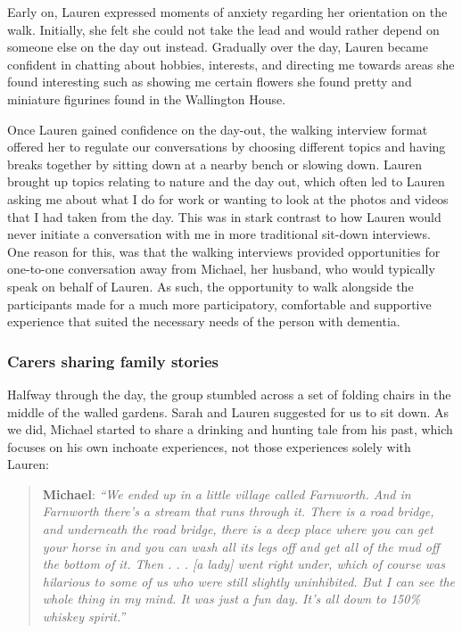 Early on, Lauren expressed moments of anxiety regarding her orientation on the walk. Initially, she felt she could not take the lead and would rather depend on someone else on the day out instead. Gradually over the day, Lauren became confident in chatting about hobbies, interests, and directing me towards areas she found interesting such as showing me certain flowers she found pretty and miniature figurines found in the Wallington House.

Once Lauren gained confidence on the day-out, the walking interview format offered her to regulate our conversations by choosing different topics and having breaks together by sitting down at a nearby bench or slowing down. Lauren brought up topics relating to nature and the day out, which often led to Lauren asking me about what I do for work or wanting to look at the photos and videos that I had taken from the day. This was in stark contrast to how Lauren would never initiate a conversation with me in more traditional sit-down interviews. One reason for this, was that the walking interviews provided opportunities for one-to-one conversation away from Michael, her husband, who would typically speak on behalf of Lauren. As such, the opportunity to walk alongside the participants made for a much more participatory, comfortable and supportive experience that suited the necessary needs of the person with dementia.

\subsubsection{Carers sharing family stories}
Halfway through the day, the group stumbled across a set of folding chairs in the middle of the walled gardens. Sarah and Lauren suggested for us to sit down. As we did, Michael started to share a drinking and hunting tale from his past, which focuses on his own inchoate experiences, not those experiences solely with Lauren:

\begin{quote}
\textbf{Michael}:\textit{    ``We ended up in a little village called Farnworth. And in Farnworth there's a stream that runs through it. There is a road bridge, and underneath the road bridge, there is a deep place where you can get your horse in and you can wash all its legs off and get all of the mud off the bottom of it. Then . . . [a lady] went right under, which of course was hilarious to some of us who were still slightly uninhibited. But I can see the whole thing in my mind. It was just a fun day. It's all down to 150\% whiskey spirit.''
}\end{quote}

